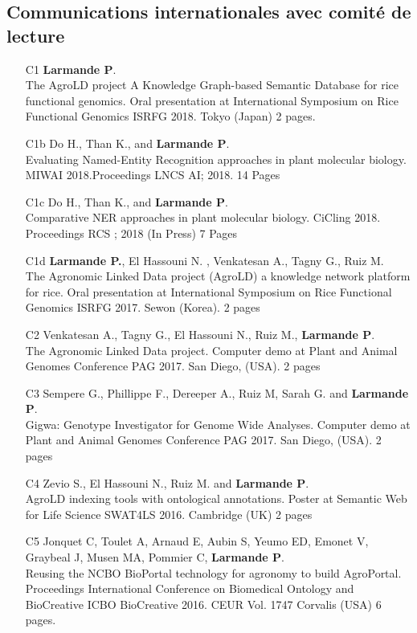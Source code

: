 \subsection*{Communications internationales avec comité de lecture}
\begin{itemize} 
\item [C1] \textbf{Larmande P}.\\ The AgroLD project A Knowledge Graph-based Semantic Database for rice functional genomics. Oral presentation at International Symposium on Rice Functional Genomics ISRFG 2018. Tokyo (Japan) 2 pages.
\item [C1b] Do H., Than K., and \textbf{Larmande P}.\\ Evaluating Named-Entity Recognition approaches in plant molecular biology. MIWAI 2018.Proceedings LNCS AI; 2018. 14 Pages
\item [C1c] Do H., Than K., and \textbf{Larmande P}.\\ Comparative NER approaches in plant molecular biology. CiCling 2018. Proceedings RCS ; 2018 (In Press) 7 Pages
\item [C1d]	\textbf{Larmande P.}, El Hassouni N. , Venkatesan A., Tagny G., Ruiz M.\\ The Agronomic Linked Data project (AgroLD) a knowledge network platform for rice. Oral presentation at International Symposium on Rice Functional Genomics ISRFG 2017. Sewon (Korea). 2 pages
\item [C2]	Venkatesan A., Tagny G., El Hassouni N., Ruiz M., \textbf{Larmande P}.\\ The Agronomic Linked Data project. Computer demo at Plant and Animal Genomes Conference PAG 2017. San Diego, (USA). 2 pages
\item [C3]	 Sempere G., Phillippe  F., Dereeper A., Ruiz M, Sarah G. and \textbf{Larmande P}.\\ Gigwa: Genotype Investigator for Genome Wide Analyses. Computer demo at Plant and Animal Genomes Conference PAG 2017. San Diego, (USA). 2 pages
\item [C4]	Zevio S., El Hassouni N., Ruiz M. and \textbf{Larmande P}.\\ AgroLD indexing tools with ontological annotations. Poster at Semantic Web for Life Science SWAT4LS 2016. Cambridge (UK) 2 pages
\item [C5]	Jonquet C, Toulet A, Arnaud E, Aubin S, Yeumo ED, Emonet V, Graybeal J, Musen MA, Pommier C, \textbf{Larmande P}.\\   Reusing the NCBO BioPortal technology for agronomy to build AgroPortal. Proceedings International Conference on Biomedical Ontology and BioCreative ICBO BioCreative 2016. CEUR Vol. 1747 Corvalis (USA) 6 pages.

\end{itemize}
